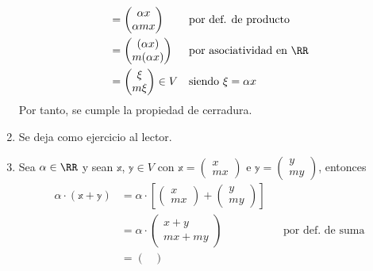 \begin{examplebox}{}{}
\begin{enumerate}[label=\roman*), topsep=6pt, itemsep=0pt]
\begin{align*}
            & = \begin{pmatrix}
                \alpha x \\
                \alpha mx
            \end{pmatrix} && \text{por def. de producto} \\
            & = \begin{pmatrix}
                (\alpha x) \\
                m(\alpha x)
            \end{pmatrix} && \text{por asociatividad en $\RR$} \\
            & = \begin{pmatrix}
                \xi \\
                m\xi
            \end{pmatrix} \in V && \text{siendo $\xi = \alpha x$}
        \end{align*}
        Por tanto, se cumple la propiedad de cerradura.
        \item Se deja como ejercicio al lector.
        \item Sea $\alpha \in \RR$ y sean $\mathbb{x}$, $\mathbb{y} \in V$ con $\mathbb{x} = \begin{pmatrix}
            x \\
            mx
        \end{pmatrix}$ e $\mathbb{y} = \begin{pmatrix}
            y \\
            my
        \end{pmatrix}$, entonces
        \begin{align*}
            \alpha \cdot (\mathbb{x} + \mathbb{y}) & = \alpha \cdot \left[ \begin{pmatrix}
                x \\
                mx
            \end{pmatrix} + \begin{pmatrix}
                y \\
                my
            \end{pmatrix} \right] \\
            & = \alpha \cdot \begin{pmatrix}
                x + y \\
                mx + my
            \end{pmatrix} && \text{por def. de suma} \\
            & = \begin{pmatrix}

\end{pmatrix}
\end{align*}
\end{enumerate}
\end{examplebox}
